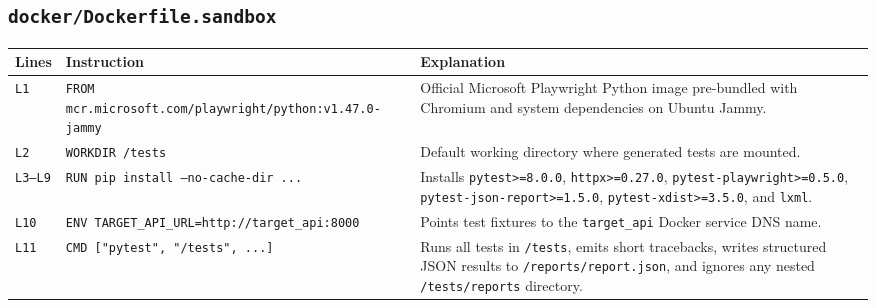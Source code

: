\documentclass[11pt,a4paper]{article}
\begin{document}
\subsection{\texttt{docker/Dockerfile.sandbox}}
\begin{longtable}{L{1.4cm} L{5.2cm} L{9.0cm}}
\toprule
\textbf{Lines} & \textbf{Instruction} & \textbf{Explanation} \\
\midrule
\endhead
\texttt{L1} & \texttt{FROM mcr.microsoft.com/playwright/python:v1.47.0-jammy} & Official Microsoft Playwright Python image pre-bundled with Chromium and system dependencies on Ubuntu Jammy. \\
\texttt{L2} & \texttt{WORKDIR /tests} & Default working directory where generated tests are mounted. \\
\texttt{L3--L9} & \texttt{RUN pip install --no-cache-dir ...} & Installs \texttt{pytest>=8.0.0}, \texttt{httpx>=0.27.0}, \texttt{pytest-playwright>=0.5.0}, \texttt{pytest-json-report>=1.5.0}, \texttt{pytest-xdist>=3.5.0}, and \texttt{lxml}. \\
\texttt{L10} & \texttt{ENV TARGET\_API\_URL=http://target\_api:8000} & Points test fixtures to the \texttt{target\_api} Docker service DNS name. \\
\texttt{L11} & \texttt{CMD ["pytest", "/tests", ...]} & Runs all tests in \texttt{/tests}, emits short tracebacks, writes structured JSON results to \texttt{/reports/report.json}, and ignores any nested \texttt{/tests/reports} directory. \\
\bottomrule
\end{longtable}

\end{document}
